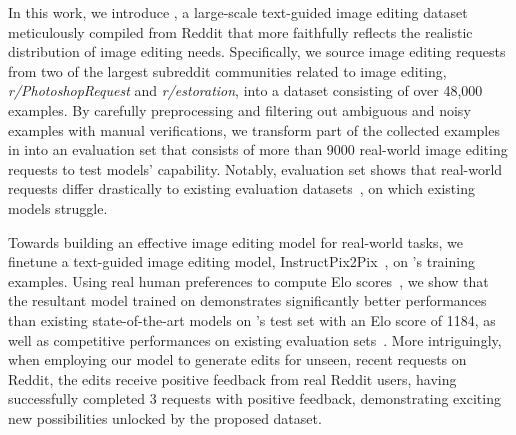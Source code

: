 In this work, we introduce \ours, a large-scale text-guided image editing dataset meticulously compiled from Reddit that more faithfully reflects the realistic distribution of image editing needs.
Specifically, we source image editing requests from two of the largest subreddit communities related to image editing, \textit{r/PhotoshopRequest} and \textit{r/estoration}, into a dataset consisting of over 48,000 examples.
By carefully preprocessing and filtering out ambiguous and noisy examples with manual verifications, we transform part of the collected examples in \ours into an evaluation set that consists of more than 9000 real-world image editing requests to test models' capability.
Notably, \ours evaluation set shows that real-world requests differ drastically to existing evaluation datasets~\cite{zhang2024magicbrush, sheynin2024emu}, on which existing models struggle.

Towards building an effective image editing model for real-world tasks, we finetune a text-guided image editing model, InstructPix2Pix~\cite{brooks2023instructpix2pix}, on \ours's training examples. Using real human preferences to compute Elo scores~\cite{}, we show that the resultant model trained on \ours demonstrates significantly better performances than existing state-of-the-art models on \ours's test set with an Elo score of 1184, as well as competitive performances on existing evaluation sets~\cite{zhang2024magicbrush, sheynin2024emu}. More intriguingly, when employing our model to generate edits for unseen, recent requests on Reddit, the edits receive positive feedback from real Reddit users, having successfully completed 3 requests with positive feedback, demonstrating exciting new possibilities unlocked by the proposed \ours dataset.




